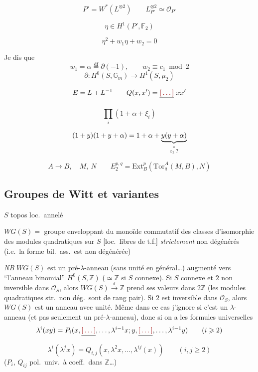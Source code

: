 \documentclass[11pt,a4paper]{article}
\begin{document}
\[
  P' = W^{*}(L^{\otimes 2}) \qquad
  L_{P'}^{\otimes 2} \simeq \mathcal{O}_{P'}
\]

\[
  \eta \in H^{1}(P', \mathbb{F}_2)
\]

\[
  \eta^{2} + w_1 \eta + w_2 = 0
\]

Je dis que
\[
  w_1 = \alpha \overset{\mathrm{df}}{=} \partial(-1), \qquad
  w_2 \equiv c_1 \bmod 2
\]
\[
  \partial : H^{0}(S, \mathbb{G}_m) \to H^{1}(S, \mu_2)
\]

\[
  E = L + L^{-1} \qquad
  Q(x, x') = \struck{\ill{}}\ x x'
\]

\[
  \prod_i (1 + \alpha + \xi_i)
\]

\[
  (1 + y)(1 + y + \alpha) = 1 + \alpha + \underbrace{y(y + \alpha)}_{\overset{\shortparallel}{c_1\,?}}
\]

\[
  A \to B, \quad M, \ N \qquad
  E_2^{p,q} = \mathrm{Ext}_B^{p}(\mathrm{Tor}_q^{A}(M, B), N)
\]

\subsection{Groupes de Witt et variantes}

$S$ topos loc.\ annelé

$WG(S) =$ groupe enveloppant du monoïde commutatif des classes d'isomorphie
des modules quadratiques sur $S$ [loc.\ libres de t.f.] \emph{strictement}
non dégénérés (i.e.\ la forme bil.\ ass.\ est non dégénérée)

\emph{NB} $WG(S)$ est un pré-$\lambda$-anneau (sans unité en général…)
augmenté vers “l'anneau binomial” $H^{0}(S, \mathbb{Z})$ ($\simeq \mathbb{Z}$
si $S$ connexe). Si $S$ connexe \struck{\ill{}} et $2$ non inversible dans
$\mathcal{O}_S$, alors $WG(S) \xrightarrow{\varepsilon} \mathbb{Z}$ prend ses
valeurs dans $2\mathbb{Z}$ (les modules quadratiques str.\ non dég.\ sont de
rang pair). Si $2$ est inversible dans $\mathcal{O}_S$, alors $WG(S)$ est un
anneau avec unité. Même dans ce cas j'ignore si c'est un $\lambda$-anneau
(et pas seulement un pré-$\lambda$-anneau), donc si on a les formules
universelles
\[
  \lambda^{i}(xy) = P_i(x, \struck{\ill{}}, \ldots, \lambda^{i-1}x ; y, \struck{\ill{}}, \ldots, \lambda^{i-1}y) \qquad (i \geqslant 2)
\]
\[
  \lambda^{i}(\lambda^{j} x) = Q_{i,j}(x, \lambda^{2}x, \ldots, \lambda^{ij}(x)) \qquad (i, j \geqslant 2)
\]
($P_i$, $Q_{ij}$ pol.\ univ.\ à coeff.\ dans $\mathbb{Z}$…)
\end{document}
